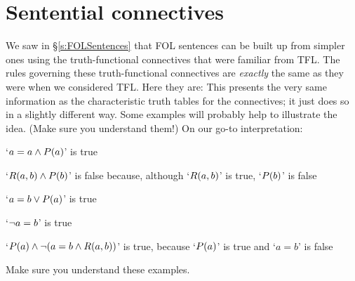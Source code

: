 \section{Sentential connectives}
We saw in \S\ref{s:FOLSentences} that FOL sentences can be built up from simpler ones using the truth-functional connectives that were familiar from TFL. The rules governing these truth-functional connectives are \emph{exactly} the same as they were when we considered TFL. Here they are:
This presents the very same information as the characteristic truth tables for the connectives; it just does so in a slightly different way. Some examples will probably help to illustrate the idea. (Make sure you understand them!) On our go-to interpretation:
	\begin{earg}
		\item[\textbullet] `$a = a \wedge \mathord{P}(a)$' is true
		\item[\textbullet] `$\mathord{R}(a,b) \wedge \mathord{P}(b)$' is false because, although `$\mathord{R}(a,b)$' is true, `$\mathord{P}(b)$' is false
		\item[\textbullet] `$a = b \vee \mathord{P}(a)$' is true
		\item[\textbullet] `$\neg a = b$' is true
		\item[\textbullet] `$\mathord{P}(a) \wedge \neg( a= b \wedge \mathord{R}(a,b))$' is true, because `$\mathord{P}(a)$' is true and `$a = b$' is false
	\end{earg}
Make sure you understand these examples.

